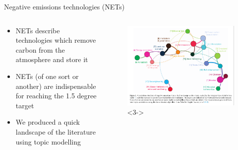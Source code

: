 \documentclass[9pt]{beamer}
\begin{document}
\begin{frame}{Negative emissions technologies (NETs)}

\begin{columns}
	\begin{column}{0.4\linewidth}
		\begin{itemize}
			\item<1-> NETs describe technologies which remove carbon from the atmosphere and store it
			\item<2-> NETs (of one sort or another) are indispensable for reaching the 1.5 degree target
			\item<3-> We produced a quick landscape of the literature using topic modelling \citep{minx2017negative} 
		\end{itemize}
	\end{column}
	\begin{column}{0.6\linewidth}
		\begin{figure}
			\includegraphics[width=\linewidth]{images/croissant.PNG}<3->
		\end{figure}
		
	\end{column}
\end{columns}

\end{frame}
\end{document}
